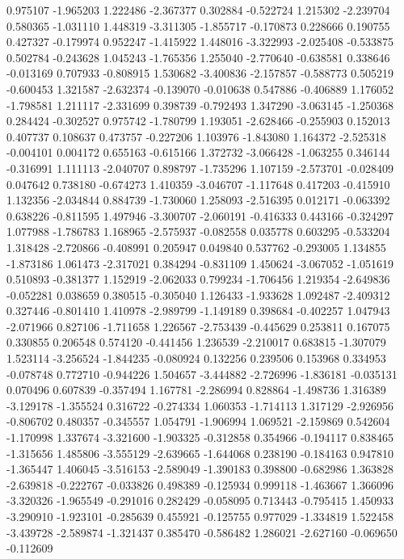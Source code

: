 0.975107
-1.965203
1.222486
-2.367377
0.302884
-0.522724
1.215302
-2.239704
0.580365
-1.031110
1.448319
-3.311305
-1.855717
-0.170873
0.228666
0.190755
0.427327
-0.179974
0.952247
-1.415922
1.448016
-3.322993
-2.025408
-0.533875
0.502784
-0.243628
1.045243
-1.765356
1.255040
-2.770640
-0.638581
0.338646
-0.013169
0.707933
-0.808915
1.530682
-3.400836
-2.157857
-0.588773
0.505219
-0.600453
1.321587
-2.632374
-0.139070
-0.010638
0.547886
-0.406889
1.176052
-1.798581
1.211117
-2.331699
0.398739
-0.792493
1.347290
-3.063145
-1.250368
0.284424
-0.302527
0.975742
-1.780799
1.193051
-2.628466
-0.255903
0.152013
0.407737
0.108637
0.473757
-0.227206
1.103976
-1.843080
1.164372
-2.525318
-0.004101
0.004172
0.655163
-0.615166
1.372732
-3.066428
-1.063255
0.346144
-0.316991
1.111113
-2.040707
0.898797
-1.735296
1.107159
-2.573701
-0.028409
0.047642
0.738180
-0.674273
1.410359
-3.046707
-1.117648
0.417203
-0.415910
1.132356
-2.034844
0.884739
-1.730060
1.258093
-2.516395
0.012171
-0.063392
0.638226
-0.811595
1.497946
-3.300707
-2.060191
-0.416333
0.443166
-0.324297
1.077988
-1.786783
1.168965
-2.575937
-0.082558
0.035778
0.603295
-0.533204
1.318428
-2.720866
-0.408991
0.205947
0.049840
0.537762
-0.293005
1.134855
-1.873186
1.061473
-2.317021
0.384294
-0.831109
1.450624
-3.067052
-1.051619
0.510893
-0.381377
1.152919
-2.062033
0.799234
-1.706456
1.219354
-2.649836
-0.052281
0.038659
0.380515
-0.305040
1.126433
-1.933628
1.092487
-2.409312
0.327446
-0.801410
1.410978
-2.989799
-1.149189
0.398684
-0.402257
1.047943
-2.071966
0.827106
-1.711658
1.226567
-2.753439
-0.445629
0.253811
0.167075
0.330855
0.206548
0.574120
-0.441456
1.236539
-2.210017
0.683815
-1.307079
1.523114
-3.256524
-1.844235
-0.080924
0.132256
0.239506
0.153968
0.334953
-0.078748
0.772710
-0.944226
1.504657
-3.444882
-2.726996
-1.836181
-0.035131
0.070496
0.607839
-0.357494
1.167781
-2.286994
0.828864
-1.498736
1.316389
-3.129178
-1.355524
0.316722
-0.274334
1.060353
-1.714113
1.317129
-2.926956
-0.806702
0.480357
-0.345557
1.054791
-1.906994
1.069521
-2.159869
0.542604
-1.170998
1.337674
-3.321600
-1.903325
-0.312858
0.354966
-0.194117
0.838465
-1.315656
1.485806
-3.555129
-2.639665
-1.644068
0.238190
-0.184163
0.947810
-1.365447
1.406045
-3.516153
-2.589049
-1.390183
0.398800
-0.682986
1.363828
-2.639818
-0.222767
-0.033826
0.498389
-0.125934
0.999118
-1.463667
1.366096
-3.320326
-1.965549
-0.291016
0.282429
-0.058095
0.713443
-0.795415
1.450933
-3.290910
-1.923101
-0.285639
0.455921
-0.125755
0.977029
-1.334819
1.522458
-3.439728
-2.589874
-1.321437
0.385470
-0.586482
1.286021
-2.627160
-0.069650
-0.112609
